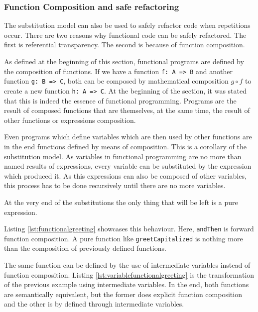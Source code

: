 \documentclass[../main.tex]{subfiles}
\begin{document}
\subsubsection{Function Composition and safe refactoring}

The substitution model can also be used to safely refactor code when repetitions
occur. There are two reasons why functional code can be safely refactored.
The first is referential transparency. The second is because of function
composition.

As defined at the beginning of this section, functional programs are defined by
the composition of functions. If we have a function \texttt{f: A => B} and
another function \texttt{g: B => C}, both can be composed by mathematical
composition $g \circ f$ to create a new function \texttt{h: A => C}. At the
beginning of the section, it was stated that this is indeed the essence of
functional programming. Programs are the result of composed functions that are themselves,
at the same time, the result of other functions or expressions composition.

Even programs which define variables which are then used by other functions are
in the end functions defined by means of composition. This is a corollary of the
substitution model. As variables in functional programming are no more than
named results of expressions, every variable can be substituted by the expression
which produced it. As this expressions can also be composed of other variables,
this process has to be done recursively until there are no more variables.

At the very end of the substitutions the only thing that will be left is a pure
expression.

Listing \ref{lst:functionalgreeting} showcases this behaviour. Here, \texttt{andThen} is 
forward function composition. A pure function
like \texttt{greetCapitalized} is nothing more than the composition of previously defined
functions.



The same function can be defined by the use of intermediate variables instead of
function composition. Listing \ref{lst:variablefunctionalgreeting} is the
transformation of the previous example using intermediate variables. In the end,
both functions are semantically equivalent, but the former does explicit
function composition and the other is by defined through intermediate variables.
\end{document}
